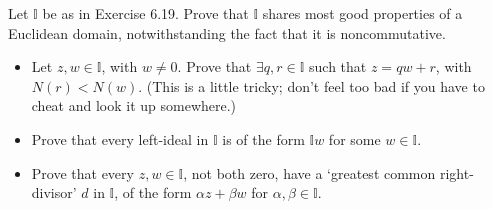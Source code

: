 \documentclass[../../master.tex]{subfiles}
\begin{document}
\begin{problem}
    Let $\mathbb{I}$ be as in Exercise 6.19.
    Prove that $\mathbb{I}$ shares most good properties of a Euclidean domain, notwithstanding the fact that it is noncommutative.
    \begin{itemize}
        \item Let $z, w \in \mathbb{I}$, with $w \neq 0$.
            Prove that $\exists q, r \in \mathbb{I}$ such that $z = qw + r$, with $N(r) < N(w)$.
            (This is a little tricky; don't feel too bad if you have to cheat and look it up somewhere.)
        \item Prove that every left-ideal in $\mathbb{I}$ is of the form $\mathbb{I}w$ for some $w \in \mathbb{I}$.
        \item Prove that every $z, w \in \mathbb{I}$, not both zero, have a `greatest common right-divisor' $d$ in $\mathbb{I}$, of the form $\alpha z + \beta w$ for $\alpha, \beta \in \mathbb{I}$.
    \end{itemize}
\end{problem}
\end{document}
